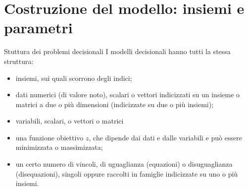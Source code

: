 \documentclass{beamer}
\begin{document}
\generatitolo

\section{Costruzione del modello: insiemi e parametri}

\begin{frame}{Stuttura dei problemi decisionali}
I modelli decisionali hanno tutti la stessa struttura:
\begin{itemize}
\item insiemi, sui quali scorrono degli indici;
\item dati numerici (di valore noto), scalari o vettori indicizzati su un insieme o matrici a due o pi\`u dimensioni (indicizzate su due o pi\`u insiemi);
\item variabili, scalari, o vettori o matrici

\item una funzione obiettivo $z$, che dipende dai dati e dalle variabili e pu\`o essere minimizzata o massimizzata;
\item un certo numero di vincoli, di uguaglianza (equazioni) o disuguaglianza
(disequazioni), singoli oppure raccolti in famiglie indicizzate su uno o pi\`u insiemi.
\end{itemize}
\end{frame}
\end{document}
